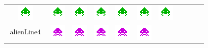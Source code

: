 \documentclass[french]{nakrule}
\begin{document}
\begin{table}[ht]
\begin{tabular}{c c c c c c c c c c c}
    \includegraphics[width=.05\textwidth]{pictures/aliens/green}&
    \includegraphics[width=.05\textwidth]{pictures/aliens/green}&
    \includegraphics[width=.05\textwidth]{pictures/aliens/green}&
    \includegraphics[width=.05\textwidth]{pictures/aliens/green}&
    \includegraphics[width=.05\textwidth]{pictures/aliens/green}&
    \includegraphics[width=.05\textwidth]{pictures/aliens/green}&
    \includegraphics[width=.05\textwidth]{pictures/aliens/green}\\
    $\begin{matrix}\text{alienLine4}\\ \text{ }\end{matrix}$ & \includegraphics[width=.05\textwidth]{pictures/aliens/purple}&
    \includegraphics[width=.05\textwidth]{pictures/aliens/purple}&
    \includegraphics[width=.05\textwidth]{pictures/aliens/purple}&
    \includegraphics[width=.05\textwidth]{pictures/aliens/purple}&
    \includegraphics[width=.05\textwidth]{pictures/aliens/purple}&

\end{tabular}
\end{table}
\end{document}
